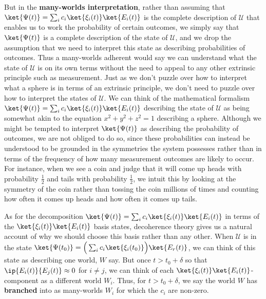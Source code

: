     But in the \textbf{many-worlds interpretation}, rather than assuming that $\ket{\Psi(t)}=\sum_i c_i \ket{\xi_i(t)}\ket{E_i(t)}$ is the complete description of $\mathcal{U}$ that enables us to work the probability of certain outcomes, we simply say that $\ket{\Psi(t)}$ is a complete description of the state of $\mathcal{U}$, and we drop the assumption that we need to interpret this state as describing probabilities of outcomes. Thus a many-worlds adherent would say we can understand what the state of $\mathcal{U}$ is on its own terms without the need to appeal to any other extrinsic principle such as measurement. Just as we don't puzzle over how to interpret what a sphere is in terms of an extrinsic principle, we don't need to puzzle over how to interpret the states of $\mathcal{U}$. We can think of the mathematical formalism $\ket{\Psi(t)}=\sum_i c_i \ket{\xi_i(t)}\ket{E_i(t)}$ describing the state of $\mathcal{U}$ as being somewhat akin to the equation $x^2+y^2+z^2=1$ describing a sphere. Although we might be tempted to interpret $\ket{\Psi(t)}$ as describing the probability of outcomes, we are not obliged to do so,  since these probabilities can instead be understood to be grounded in the symmetries the system possesses rather than in terms of the frequency of how many measurement outcomes are likely to occur. For instance, when we see a coin and judge that it will come up heads with probability $\frac{1}{2}$ and tails with probability $\frac{1}{2}$, we intuit this by looking at the symmetry of the coin rather than tossing the coin millions of times and counting how often it comes up heads and how often it comes up tails.
     
    As for the decomposition $\ket{\Psi(t)}=\sum_i c_i \ket{\xi_i(t)}\ket{E_i(t)}$  in terms of the $\ket{\xi_i(t)}\ket{E_i(t)}$ basis states, decoherence theory gives us a natural account of why we should choose this basis rather than any other. When $\mathcal{U}$ is in the state $\ket{\Psi(t_0)}=\Big(\sum_i c_i \ket{\xi_i(t_0)}\Big)\ket{E_r(t)}$, we can think of this state as describing one world, $W$ say. But once $t>t_0+\delta$ so that $\ip{E_i(t)}{E_j(t)}\approx 0$ for $i\neq j$, we can think of each $\ket{\xi_i(t)}\ket{E_i(t)}$-component as a different world $W_i$. Thus, for $t>t_0+\delta$, we say the world $W$ has \textbf{branched} into as many-worlds $W_i$ for which the $c_i$ are non-zero. 
    
